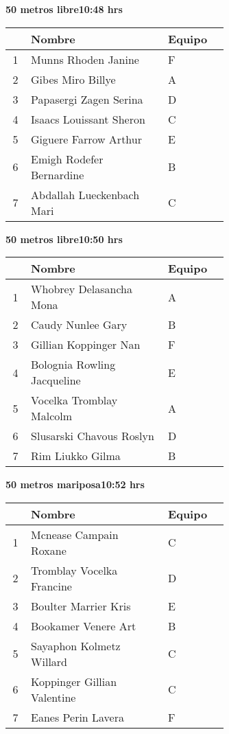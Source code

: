 \begin{minipage}{0.95\linewidth}
\begin{center}
\textbf{
50 metros libre\hspace{1cm}10:48 hrs}
\end{center}
\begin{tabular}{cp{0.63\linewidth}l}
\hline
& \textbf{Nombre} & \textbf{Equipo} \\ \hline
1 & Munns Rhoden Janine & F \\ 
2 & Gibes Miro Billye & A \\ 
3 & Papasergi Zagen Serina & D \\ 
4 & Isaacs Louissant Sheron & C \\ 
5 & Giguere Farrow Arthur & E \\ 
6 & Emigh Rodefer Bernardine & B \\ 
7 & Abdallah Lueckenbach Mari & C \\ 
\end{tabular}
\end{minipage}
\begin{minipage}{0.95\linewidth}
\begin{center}
\textbf{
50 metros libre\hspace{1cm}10:50 hrs}
\end{center}
\begin{tabular}{cp{0.63\linewidth}l}
\hline
& \textbf{Nombre} & \textbf{Equipo} \\ \hline
1 & Whobrey Delasancha Mona & A \\ 
2 & Caudy Nunlee Gary & B \\ 
3 & Gillian Koppinger Nan & F \\ 
4 & Bolognia Rowling Jacqueline & E \\ 
5 & Vocelka Tromblay Malcolm & A \\ 
6 & Slusarski Chavous Roslyn & D \\ 
7 & Rim Liukko Gilma & B \\ 
\end{tabular}
\end{minipage}
\begin{minipage}{0.95\linewidth}
\begin{center}
\textbf{
50 metros mariposa\hspace{1cm}10:52 hrs}
\end{center}
\begin{tabular}{cp{0.63\linewidth}l}
\hline
& \textbf{Nombre} & \textbf{Equipo} \\ \hline
1 & Mcnease Campain Roxane & C \\ 
2 & Tromblay Vocelka Francine & D \\ 
3 & Boulter Marrier Kris & E \\ 
4 & Bookamer Venere Art & B \\ 
5 & Sayaphon Kolmetz Willard & C \\ 
6 & Koppinger Gillian Valentine & C \\ 
7 & Eanes Perin Lavera & F \\ 
\end{tabular}
\end{minipage}
